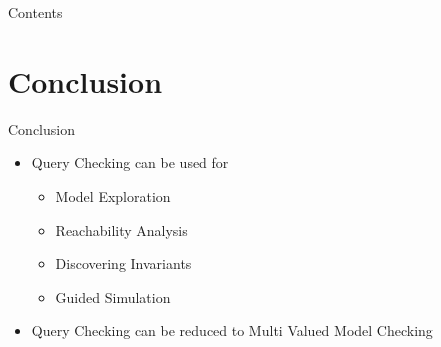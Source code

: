 

\frame{\titlepage}

\begin{frame}{Contents}
  \tableofcontents
\end{frame}







\section*{Conclusion}
\begin{frame}{Conclusion}
  \begin{itemize}
    \item Query Checking can be used for
    \begin{itemize}
      \item Model Exploration
      \item Reachability Analysis
      \item Discovering Invariants
      \item Guided Simulation
    \end{itemize}
    \item Query Checking can be reduced to Multi Valued Model Checking
  \end{itemize}
\end{frame}





%  
%  

